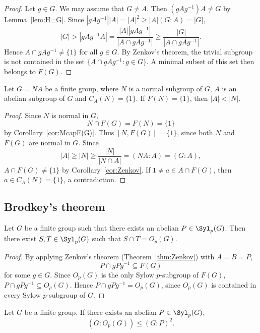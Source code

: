 \begin{proof}
	Let $g\in G$. We may assume that $G\ne A$. Then $(gAg^{-1})A\ne G$ by Lemma~\ref{lem:H=G}. Since 
	$|gAg^{-1}||A|=|A|^2\geq |A|(G:A)=|G|$, 
	\[
		|G|>|gAg^{-1}A|
		=\frac{|A||gAg^{-1}|}{|A\cap gAg^{-1}|}
		\geq \frac{|G|}{|A\cap gAg^{-1}|}.
	\]
	Hence $A\cap gAg^{-1}\ne\{1\}$ for all $g\in G$. By Zenkov's theorem, 
    the trivial subgroup is not contained in 
    the set $\{A\cap gAg^{-1}:g\in G\}$. A minimal subset 
    of this set then belongs to $F(G)$. 
\end{proof}

\begin{corollary}
	Let $G=NA$ be a finite group, where $N$ is a normal subgroup of $G$, $A$ is an abelian subgroup of $G$ and 
	$C_A(N)=\{1\}$. If $F(N)=\{1\}$, then $|A|<|N|$. 
\end{corollary}

\begin{proof}
	Since $N$ is normal in $G$, 
	\[
    N\cap F(G)=F(N)=\{1\}
    \]
    by Corollary~\ref{cor:McapF(G)}. Thus $[N,F(G)]=\{1\}$, since 
	both $N$ and $F(G)$ are normal in $G$. Since 
	\[
	|A|\geq |N|\geq \frac{|N|}{|N\cap A|}=(NA:A)=(G:A),
	\]
	$A\cap F(G)\ne\{1\}$ by Corollary~\ref{cor:Zenkov}. If $1\ne a\in
	A\cap F(G)$, then $a\in C_A(N)=\{1\}$, a contradiction. 
\end{proof}

\subsection{Brodkey's theorem}

\begin{theorem}[Brodkey]
	\label{thm:Brodkey}
	Let $G$ be a finite group such that there exists an abelian $P\in\Syl_p(G)$. Then
    there exist $S,T\in\Syl_p(G)$ such that $S\cap T=O_p(G)$.
\end{theorem}

\begin{proof}
	By applying Zenkov's theorem (Theorem~\ref{thm:Zenkov}) with $A=B=P$, 
	\[
    P\cap gPg^{-1}\subseteq F(G)
    \]
    for some $g\in G$. Since $O_p(G)$ is the only Sylow $p$-subgroup of 
	$F(G)$, $P\cap gPg^{-1}\subseteq O_p(G)$.
	Hence $P\cap gPg^{-1}=O_p(G)$, since $O_p(G)$ is contained in every Sylow $p$-subgroup 
	of $G$. 
\end{proof}

\begin{corollary}
	\label{corollary:GP2}
	Let $G$ be a finite group. If there exists an abelian $P\in \Syl_p(G)$, 
	\[
	(G:O_p(G))\leq (G:P)^2. 
	\]
\end{corollary}

